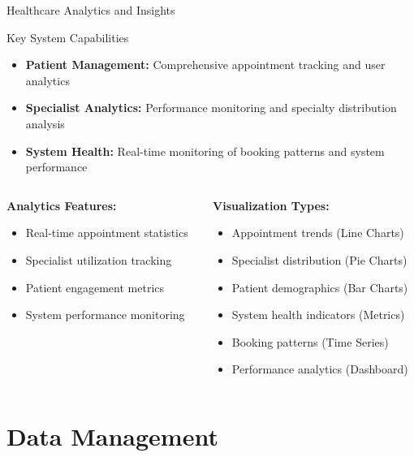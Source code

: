 \documentclass[aspectratio=169]{beamer}
\begin{document}
\begin{frame}{Healthcare Analytics and Insights}
\begin{block}{Key System Capabilities}
\begin{itemize}
    \item \textbf{Patient Management:} Comprehensive appointment tracking and user analytics
    \item \textbf{Specialist Analytics:} Performance monitoring and specialty distribution analysis
    \item \textbf{System Health:} Real-time monitoring of booking patterns and system performance
\end{itemize}
\end{block}

\vspace{0.5cm}

\begin{columns}
\begin{column}{0.5\textwidth}
\textbf{Analytics Features:}
\begin{itemize}
    \item Real-time appointment statistics
    \item Specialist utilization tracking
    \item Patient engagement metrics
    \item System performance monitoring
\end{itemize}
\end{column}
\begin{column}{0.5\textwidth}
\textbf{Visualization Types:}
\begin{itemize}
    \item Appointment trends (Line Charts)
    \item Specialist distribution (Pie Charts)
    \item Patient demographics (Bar Charts)
    \item System health indicators (Metrics)
    \item Booking patterns (Time Series)
    \item Performance analytics (Dashboard)
\end{itemize}
\end{column}
\end{columns}
\end{frame}

\section{Data Management}
\end{document}
